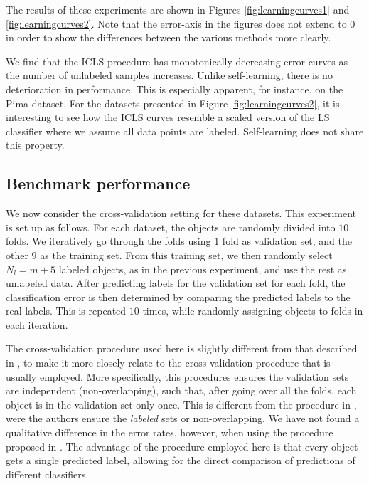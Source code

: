 \documentclass{elsarticle}
\begin{document}
The results of these experiments are shown in Figures \ref{fig:learningcurves1} and \ref{fig:learningcurves2}. Note that the error-axis in the figures does not extend to $0$ in order to show the differences between the various methods more clearly.

We find that the ICLS procedure has monotonically decreasing error curves as the number of unlabeled samples increases. Unlike self-learning, there is no deterioration in performance. This is especially apparent, for instance, on the Pima dataset. For the datasets presented in Figure \ref{fig:learningcurves2}, it is interesting to see how the ICLS curves resemble a scaled version of the LS classifier where we assume all data points are labeled. Self-learning does not share this property.


\subsection{Benchmark performance}
We now consider the cross-validation setting for these datasets. This experiment is set up as follows. For each dataset, the objects are randomly divided into $10$ folds. We iteratively go through the folds using $1$ fold as validation set, and the other $9$ as the training set. From this training set, we then randomly select $N_l=m+5$ labeled objects, as in the previous experiment, and use the rest as unlabeled data. After predicting labels for the validation set for each fold, the classification error is then determined by comparing the predicted labels to the real labels. This is repeated $10$ times, while randomly assigning objects to folds in each iteration.

The cross-validation procedure used here is slightly different from that described in \cite{Chapelle2006}, to make it more closely relate to the cross-validation procedure that is usually employed. More specifically, this procedures ensures the validation sets are independent (non-overlapping), such that, after going over all the folds, each object is in the validation set only once. This is different from the procedure in \cite{Chapelle2006}, were the authors ensure the \emph{labeled} sets or non-overlapping. We have not found a qualitative difference in the error rates, however, when using the procedure proposed in \cite{Chapelle2006}. The advantage of the procedure employed here is that every object gets a single predicted label, allowing for the direct comparison of predictions of different classifiers.
\end{document}
